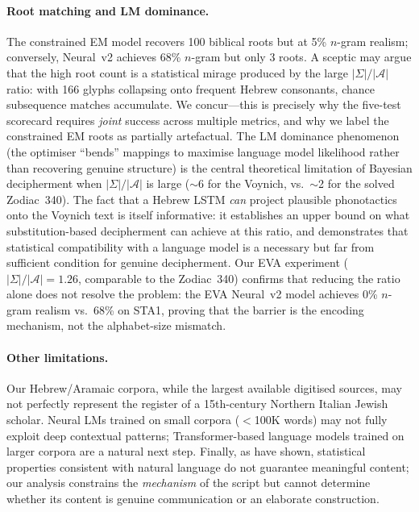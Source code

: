 \paragraph{Root matching and LM dominance.}
The constrained EM model recovers 100 biblical roots but at 5\% $n$-gram realism; conversely, Neural~v2 achieves 68\% $n$-gram but only 3 roots.  A sceptic may argue that the high root count is a statistical mirage produced by the large $|\Sigma|/|\mathcal{A}|$ ratio: with 166 glyphs collapsing onto frequent Hebrew consonants, chance subsequence matches accumulate.  We concur---this is precisely why the five-test scorecard requires \emph{joint} success across multiple metrics, and why we label the constrained EM roots as partially artefactual.  The LM dominance phenomenon (the optimiser ``bends'' mappings to maximise language model likelihood rather than recovering genuine structure) is the central theoretical limitation of Bayesian decipherment when $|\Sigma|/|\mathcal{A}|$ is large ($\sim$6 for the Voynich, vs.\ $\sim$2 for the solved Zodiac~340).  The fact that a Hebrew LSTM \emph{can} project plausible phonotactics onto the Voynich text is itself informative: it establishes an upper bound on what substitution-based decipherment can achieve at this ratio, and demonstrates that statistical compatibility with a language model is a necessary but far from sufficient condition for genuine decipherment.  Our EVA experiment ($|\Sigma|/|\mathcal{A}|=1.26$, comparable to the Zodiac~340) confirms that reducing the ratio alone does not resolve the problem: the EVA Neural~v2 model achieves 0\% $n$-gram realism vs.\ 68\% on STA1, proving that the barrier is the encoding mechanism, not the alphabet-size mismatch.

\paragraph{Other limitations.}
Our Hebrew/Aramaic corpora, while the largest available digitised sources, may not perfectly represent the register of a 15th-century Northern Italian Jewish scholar.  Neural LMs trained on small corpora ($<$100K words) may not fully exploit deep contextual patterns; Transformer-based language models trained on larger corpora are a natural next step.  Finally, as \citet{gaskell2022} have shown, statistical properties consistent with natural language do not guarantee meaningful content; our analysis constrains the \emph{mechanism} of the script but cannot determine whether its content is genuine communication or an elaborate construction.


